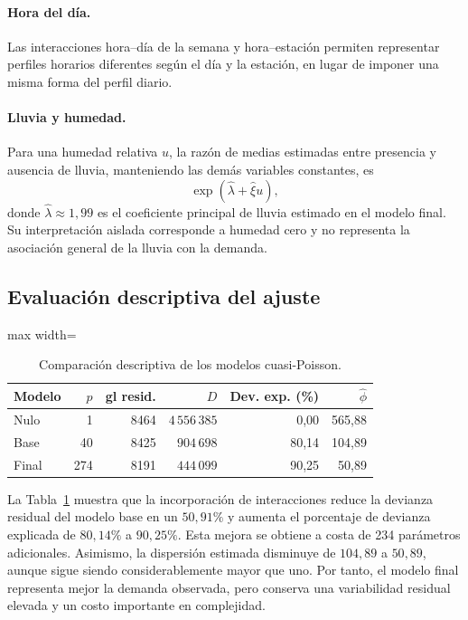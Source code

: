 \documentclass[12pt, a4paper]{article}
\numberwithin{equation}{section}
\begin{document}
\paragraph{Hora del día.} Las interacciones hora--día de la semana y hora--estación permiten representar perfiles horarios diferentes según el día y la estación, en lugar de imponer una misma forma del perfil diario.

\paragraph{Lluvia y humedad.} Para una humedad relativa $u$, la razón de medias estimadas entre presencia y ausencia de lluvia, manteniendo las demás variables constantes, es
\[
\exp(\widehat\lambda+\widehat\xi u),
\]
donde $\widehat\lambda\approx1{,}99$ es el coeficiente principal de lluvia estimado en el modelo final.
Su interpretación aislada corresponde a humedad cero y no representa la asociación general de la lluvia con la demanda.

\subsection{Evaluación descriptiva del ajuste}

\begin{table}[htbp]
\centering\small
\caption{Comparación descriptiva de los modelos cuasi-Poisson.}
\label{tab:res_ajuste}
\begin{adjustbox}{max width=\linewidth}
\begin{tabular}{lrrrrr}\toprule
Modelo & $p$ & gl resid. & $D$ & Dev. exp. (\%) & $\widehat\phi$ \\\midrule
Nulo & 1 & 8464 & $4\,556\,385$ & 0{,}00 & 565{,}88 \\
Base & 40 & 8425 & $904\,698$ & 80{,}14 & 104{,}89 \\
Final & 274 & 8191 & $444\,099$ & 90{,}25 & 50{,}89 \\\bottomrule
\end{tabular}
\end{adjustbox}
\end{table}

La Tabla~\ref{tab:res_ajuste} muestra que la incorporación de interacciones reduce la devianza residual del modelo base en un $50{,}91\%$ y aumenta el porcentaje de devianza explicada de $80{,}14\%$ a $90{,}25\%$. Esta mejora se obtiene a costa de 234 parámetros adicionales. Asimismo, la dispersión estimada disminuye de $104{,}89$ a $50{,}89$, aunque sigue siendo considerablemente mayor que uno. Por tanto, el modelo final representa mejor la demanda observada, pero conserva una variabilidad residual elevada y un costo importante en complejidad.
\end{document}
